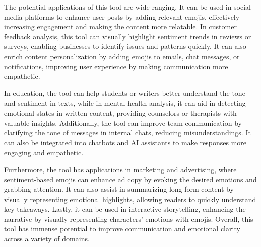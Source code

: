 \documentclass{article}
\begin{document}
The potential applications of this tool are wide-ranging. It can be used in social media platforms to enhance user posts by adding relevant emojis, effectively increasing engagement and making the content more relatable. In customer feedback analysis, this tool can visually highlight sentiment trends in reviews or surveys, enabling businesses to identify issues and patterns quickly. It can also enrich content personalization by adding emojis to emails, chat messages, or notifications, improving user experience by making communication more empathetic.

In education, the tool can help students or writers better understand the tone and sentiment in texts, while in mental health analysis, it can aid in detecting emotional states in written content, providing counselors or therapists with valuable insights. Additionally, the tool can improve team communication by clarifying the tone of messages in internal chats, reducing misunderstandings. It can also be integrated into chatbots and AI assistants to make responses more engaging and empathetic.

Furthermore, the tool has applications in marketing and advertising, where sentiment-based emojis can enhance ad copy by evoking the desired emotions and grabbing attention. It can also assist in summarizing long-form content by visually representing emotional highlights, allowing readers to quickly understand key takeaways. Lastly, it can be used in interactive storytelling, enhancing the narrative by visually representing characters' emotions with emojis. Overall, this tool has immense potential to improve communication and emotional clarity across a variety of domains.
\end{document}
